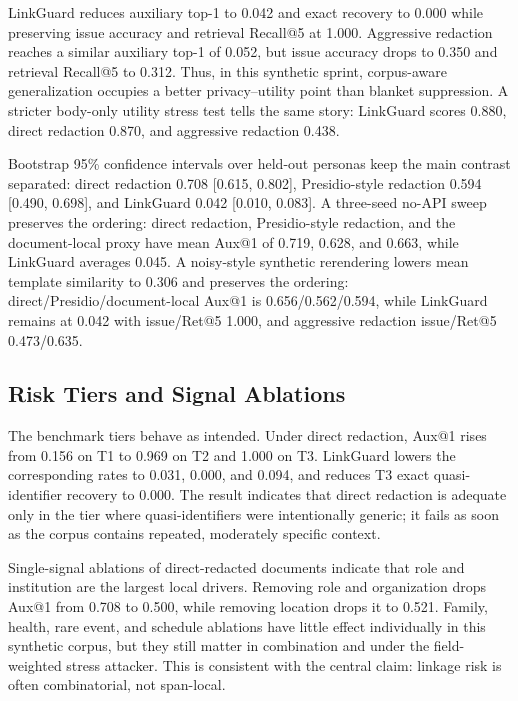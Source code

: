 \documentclass{article}
\newcommand{\method}{LinkGuard}
\begin{document}
\method{} reduces auxiliary top-1 to 0.042 and exact recovery to 0.000 while preserving issue accuracy and retrieval Recall@5 at 1.000.
Aggressive redaction reaches a similar auxiliary top-1 of 0.052, but issue accuracy drops to 0.350 and retrieval Recall@5 to 0.312.
Thus, in this synthetic sprint, corpus-aware generalization occupies a better privacy--utility point than blanket suppression.
A stricter body-only utility stress test tells the same story: \method{} scores 0.880, direct redaction 0.870, and aggressive redaction 0.438.

Bootstrap 95\% confidence intervals over held-out personas keep the main contrast separated: direct redaction 0.708 [0.615, 0.802], Presidio-style redaction 0.594 [0.490, 0.698], and \method{} 0.042 [0.010, 0.083].
A three-seed no-API sweep preserves the ordering: direct redaction, Presidio-style redaction, and the document-local proxy have mean Aux@1 of 0.719, 0.628, and 0.663, while \method{} averages 0.045.
A noisy-style synthetic rerendering lowers mean template similarity to 0.306 and preserves the ordering: direct/Presidio/document-local Aux@1 is 0.656/0.562/0.594, while \method{} remains at 0.042 with issue/Ret@5 1.000, and aggressive redaction issue/Ret@5 0.473/0.635.

\subsection{Risk Tiers and Signal Ablations}

The benchmark tiers behave as intended.
Under direct redaction, Aux@1 rises from 0.156 on T1 to 0.969 on T2 and 1.000 on T3.
\method{} lowers the corresponding rates to 0.031, 0.000, and 0.094, and reduces T3 exact quasi-identifier recovery to 0.000.
The result indicates that direct redaction is adequate only in the tier where quasi-identifiers were intentionally generic; it fails as soon as the corpus contains repeated, moderately specific context.

Single-signal ablations of direct-redacted documents indicate that role and institution are the largest local drivers.
Removing role and organization drops Aux@1 from 0.708 to 0.500, while removing location drops it to 0.521.
Family, health, rare event, and schedule ablations have little effect individually in this synthetic corpus, but they still matter in combination and under the field-weighted stress attacker.
This is consistent with the central claim: linkage risk is often combinatorial, not span-local.
\end{document}
